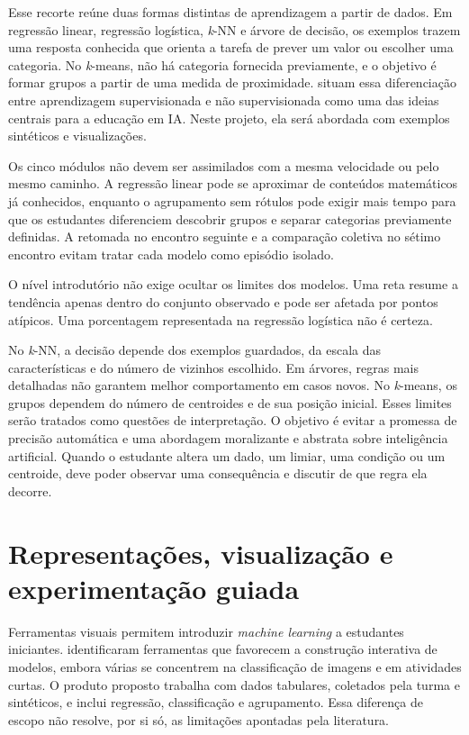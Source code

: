Esse recorte reúne duas formas distintas de aprendizagem a partir de dados. Em regressão linear, regressão logística, \textit{k}-NN e árvore de decisão, os exemplos trazem uma resposta conhecida que orienta a tarefa de prever um valor ou escolher uma categoria. No \textit{k}-means, não há categoria fornecida previamente, e o objetivo é formar grupos a partir de uma medida de proximidade.  situam essa diferenciação entre aprendizagem supervisionada e não supervisionada como uma das ideias centrais para a educação em IA. Neste projeto, ela será abordada com exemplos sintéticos e visualizações.

Os cinco módulos não devem ser assimilados com a mesma velocidade ou pelo mesmo caminho. A regressão linear pode se aproximar de conteúdos matemáticos já conhecidos, enquanto o agrupamento sem rótulos pode exigir mais tempo para que os estudantes diferenciem descobrir grupos e separar categorias previamente definidas. A retomada no encontro seguinte e a comparação coletiva no sétimo encontro evitam tratar cada modelo como episódio isolado.

O nível introdutório não exige ocultar os limites dos modelos. Uma reta resume a tendência apenas dentro do conjunto observado e pode ser afetada por pontos atípicos. Uma porcentagem representada na regressão logística não é certeza.

No \textit{k}-NN, a decisão depende dos exemplos guardados, da escala das características e do número de vizinhos escolhido. Em árvores, regras mais detalhadas não garantem melhor comportamento em casos novos. No \textit{k}-means, os grupos dependem do número de centroides e de sua posição inicial. Esses limites serão tratados como questões de interpretação. O objetivo é evitar a promessa de precisão automática e uma abordagem moralizante e abstrata sobre inteligência artificial. Quando o estudante altera um dado, um limiar, uma condição ou um centroide, deve poder observar uma consequência e discutir de que regra ela decorre.

\section{Representações, visualização e experimentação guiada}

Ferramentas visuais permitem introduzir \textit{machine learning} a estudantes iniciantes.  identificaram ferramentas que favorecem a construção interativa de modelos, embora várias se concentrem na classificação de imagens e em atividades curtas. O produto proposto trabalha com dados tabulares, coletados pela turma e sintéticos, e inclui regressão, classificação e agrupamento. Essa diferença de escopo não resolve, por si só, as limitações apontadas pela literatura.

